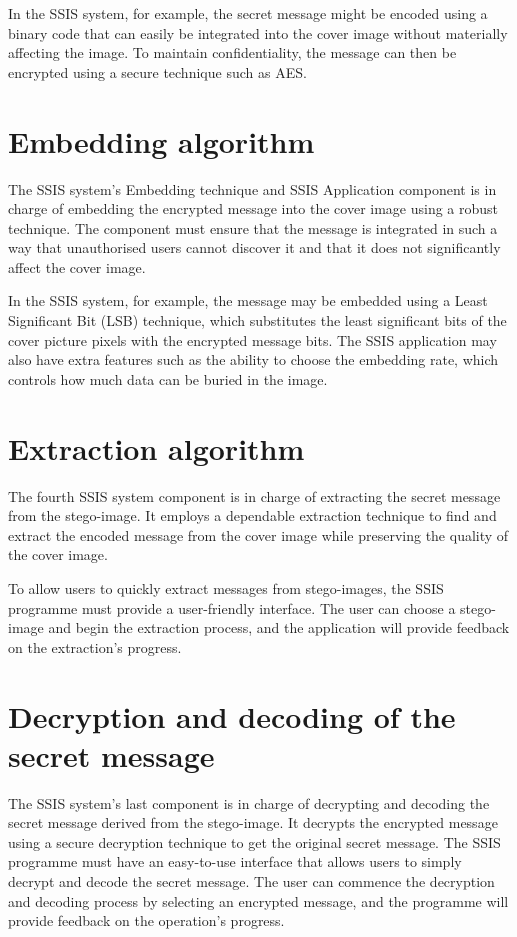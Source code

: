 In the SSIS system, for example, the secret message might be encoded using a binary code that can easily be integrated into the cover image without materially affecting the image. To maintain confidentiality, the message can then be encrypted using a secure technique such as AES.

\section{Embedding algorithm}
The SSIS system's Embedding technique and SSIS Application component is in charge of embedding the encrypted message into the cover image using a robust technique. The component must ensure that the message is integrated in such a way that unauthorised users cannot discover it and that it does not significantly affect the cover image.

In the SSIS system, for example, the message may be embedded using a Least Significant Bit (LSB) technique, which substitutes the least significant bits of the cover picture pixels with the encrypted message bits. The SSIS application may also have extra features such as the ability to choose the embedding rate, which controls how much data can be buried in the image.

\section{Extraction algorithm}
The fourth SSIS system component is in charge of extracting the secret message from the stego-image. It employs a dependable extraction technique to find and extract the encoded message from the cover image while preserving the quality of the cover image.

To allow users to quickly extract messages from stego-images, the SSIS programme must provide a user-friendly interface. The user can choose a stego-image and begin the extraction process, and the application will provide feedback on the extraction's progress.

\section{Decryption and decoding of the secret message}
The SSIS system's last component is in charge of decrypting and decoding the secret message derived from the stego-image. It decrypts the encrypted message using a secure decryption technique to get the original secret message.
The SSIS programme must have an easy-to-use interface that allows users to simply decrypt and decode the secret message. The user can commence the decryption and decoding process by selecting an encrypted message, and the programme will provide feedback on the operation's progress.

